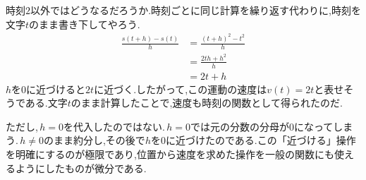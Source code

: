 時刻$2$以外ではどうなるだろうか.時刻ごとに同じ計算を繰り返す代わりに,時刻を文字$t$のまま書き下してやろう.
\begin{align*}
 \frac{s(t+h)-s(t)}h
 &=\frac{(t+h)^2-t^2}h\\
 &=\frac{2th+h^2}h\\
 &=2t+h
\end{align*}
$h$を$0$に近づけると$2t$に近づく.したがって,この運動の速度は$v(t)=2t$と表せそうである.文字$t$のまま計算したことで,速度も時刻の関数として得られたのだ.

ただし,\,$h=0$を代入したのではない.\,$h=0$では元の分数の分母が$0$になってしまう.\,$h\ne0$のまま約分し,その後で$h$を$0$に近づけたのである.この「近づける」操作を明確にするのが極限であり,位置から速度を求めた操作を一般の関数にも使えるようにしたものが微分である.
